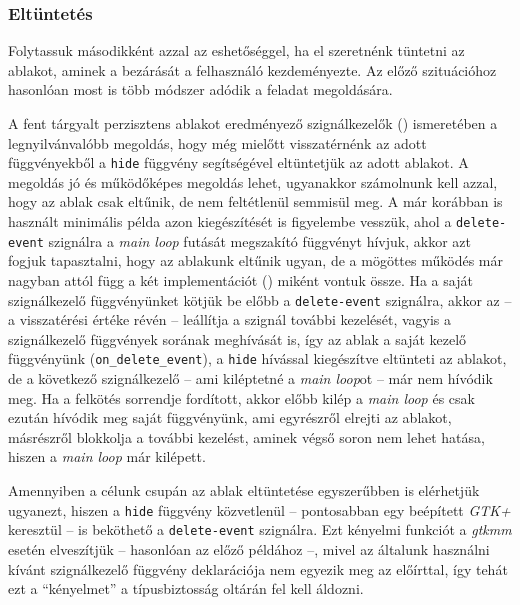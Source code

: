 \subsubsection{Eltüntetés}

Folytassuk másodikként azzal az eshetőséggel, ha el szeretnénk tüntetni az ablakot, aminek a bezárását a felhasználó kezdeményezte. Az előző szituációhoz hasonlóan most is több módszer adódik a feladat megoldására.

A fent tárgyalt perzisztens ablakot eredményező szignálkezelők () ismeretében a legnyilvánvalóbb megoldás, hogy még mielőtt visszatérnénk az adott függvényekből a \texttt{hide} függvény segítségével eltüntetjük az adott ablakot. A megoldás jó és működőképes megoldás lehet, ugyanakkor számolnunk kell azzal, hogy az ablak csak eltűnik, de nem feltétlenül semmisül meg. A már korábban is használt minimális példa azon kiegészítését is figyelembe vesszük, ahol a \texttt{delete-event} szignálra a \textit{main loop} futását megszakító függvényt hívjuk, akkor azt fogjuk tapasztalni, hogy az ablakunk eltűnik ugyan, de a mögöttes működés már nagyban attól függ a két implementációt () miként vontuk össze. Ha a saját szignálkezelő függvényünket kötjük be előbb a \texttt{delete-event} szignálra, akkor az -- a visszatérési értéke révén -- leállítja a szignál további kezelését, vagyis a szignálkezelő függvények sorának meghívását is, így az ablak a saját kezelő függvényünk (\texttt{on\_delete\_event}), a \texttt{hide} hívással kiegészítve eltünteti az ablakot, de a következő szignálkezelő -- ami kiléptetné a \textit{main loop}ot -- már nem hívódik meg. Ha a felkötés sorrendje fordított, akkor előbb kilép a \textit{main loop} és csak ezután hívódik meg saját függvényünk, ami egyrészről elrejti az ablakot, másrészről blokkolja a további kezelést, aminek végső soron nem lehet hatása, hiszen a \textit{main loop} már kilépett.

Amennyiben a célunk csupán az ablak eltüntetése egyszerűbben is elérhetjük ugyanezt, hiszen a \texttt{hide} függvény közvetlenül -- pontosabban egy beépített \textit{GTK+} keresztül -- is beköthető a \texttt{delete-event} szignálra. Ezt kényelmi funkciót a \textit{gtkmm} esetén elveszítjük -- hasonlóan az előző példához --, mivel az általunk használni kívánt szignálkezelő függvény deklarációja nem egyezik meg az előírttal, így tehát ezt a ``kényelmet'' a típusbiztosság oltárán fel kell áldozni.

